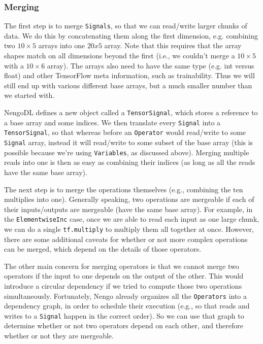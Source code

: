 \documentclass{article}
\begin{document}
\subsubsection{Merging}

The first step is to merge \texttt{Signals}, so that we can read/write larger chunks of data.  We do this by concatenating them along the first dimension, e.g. combining two $10 \times 5$ arrays into one $20 x 5$ array.  Note that this requires that the array shapes match on all dimensions beyond the first (i.e., we couldn't merge a $10 \times 5$ with a $10 \times 6$ array).  The arrays also need to have the same type (e.g. int versus float) and other TensorFlow meta information, such as trainability.  Thus we will still end up with various different base arrays, but a much smaller number than we started with.


NengoDL defines a new object called a \texttt{TensorSignal}, which stores a reference to a base array and some indices.  We then translate every \texttt{Signal} into a \texttt{TensorSignal}, so that whereas before an \texttt{Operator} would read/write to some \texttt{Signal} array, instead it will read/write to some subset of the base array (this is possible because we're using \texttt{Variables}, as discussed above).  Merging multiple reads into one is then as easy as combining their indices (as long as all the reads have the same base array).

The next step is to merge the operations themselves (e.g., combining the ten multiplies into one).  Generally speaking, two operations are mergeable if each of their inputs/outputs are mergeable (have the same base array).  For example, in the \texttt{ElementwiseInc} case, once we are able to read each input as one large chunk, we can do a single \texttt{tf.multiply} to multiply them all together at once.  However, there are some additional caveats for whether or not more complex operations can be merged, which depend on the details of those operators.

The other main concern for merging operators is that we cannot merge two operators if the input to one depends on the output of the other.  This would introduce a circular dependency if we tried to compute those two operations simultaneously.  Fortunately, Nengo already organizes all the \texttt{Operators} into a dependency graph, in order to schedule their execution (e.g., so that reads and writes to a \texttt{Signal} happen in the correct order).  So we can use that graph to determine whether or not two operators depend on each other, and therefore whether or not they are mergeable.
\end{document}
